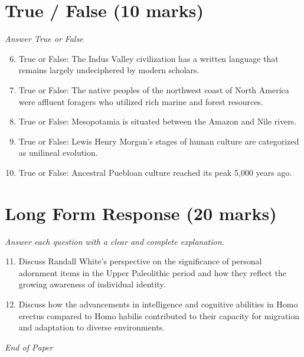 \documentclass[12pt]{article}
\begin{document}
\section*{True / False (10 marks)}
\textit{Answer True or False}
\begin{enumerate}[label=\arabic*.]
\setcounter{enumi}{5}
\item True or False: The Indus Valley civilization has a written language that remains largely undeciphered by modern scholars.
\item True or False: The native peoples of the northwest coast of North America were affluent foragers who utilized rich marine and forest resources.
\item True or False: Mesopotamia is situated between the Amazon and Nile rivers.
\item True or False: Lewis Henry Morgan's stages of human culture are categorized as unilineal evolution.
\item True or False: Ancestral Puebloan culture reached its peak 5,000 years ago.
\end{enumerate}

\section*{Long Form Response (20 marks)}
\textit{Answer each question with a clear and complete explanation.}
\begin{enumerate}[label=\arabic*.]
\setcounter{enumi}{10}
\item Discuss Randall White's perspective on the significance of personal adornment items in the Upper Paleolithic period and how they reflect the growing awareness of individual identity.
\item Discuss how the advancements in intelligence and cognitive abilities in Homo erectus compared to Homo habilis contributed to their capacity for migration and adaptation to diverse environments.
\end{enumerate}

\vfill
\noindent\textit{End of Paper}
\end{document}
